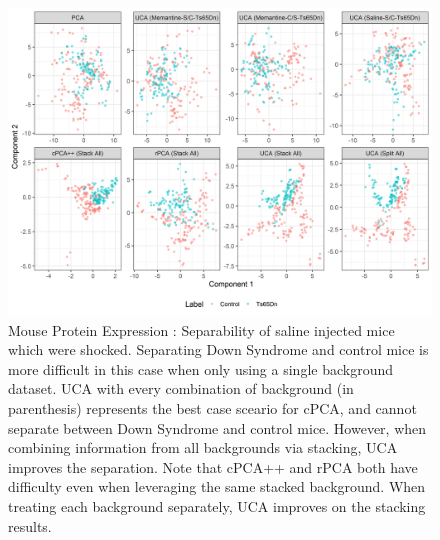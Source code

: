 \documentclass[12pt]{article}
\begin{document}

\begin{figure}[t]
    \centering
	\includegraphics[width = 1.0\textwidth]{figure/Mouse_split_stack_Ts65Dn.png}
	\caption{Mouse Protein Expression : Separability of saline injected mice which were shocked. Separating Down Syndrome and control mice is more difficult in this case when only using a single background dataset. UCA with every combination of background (in parenthesis) represents the best case sceario for cPCA, and cannot separate between Down Syndrome and control mice. However, when combining information from all backgrounds via stacking, UCA improves the separation. Note that cPCA++ and rPCA both have difficulty even when leveraging the same stacked background.  When treating each background separately, UCA improves on the stacking results.}
	    \label{fig:MouseSplitStack}
\end{figure}


\end{document}
